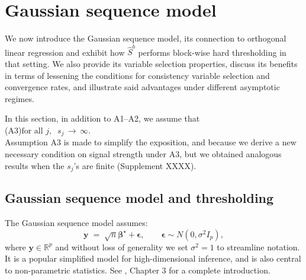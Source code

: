 \documentclass[aos]{imsart}
\theoremstyle{plain}
\newcommand{\bs}{\boldsymbol}
\begin{document}
\section{Gaussian sequence model}\label{sec:properties_orth}

We now introduce the Gaussian sequence model, its connection to orthogonal linear regression and exhibit how $\hat S^b$ performs block-wise hard thresholding in that setting. We also provide its variable selection properties, discuss its benefits in terms of lessening the conditions for consistency variable selection and convergence rates, and illustrate said advantages under different asymptotic regimes.

In this section, in addition to A1--A2, we assume that \\[5pt]
(A3)\quad $\text{for all } j, \;\; s_j \,\to \, \infty$.\\[5pt]
Assumption A3 is made to simplify the exposition, and because we derive a new necessary condition on signal strength under A3, but we obtained analogous results when the $s_j$'s are finite (Supplement XXXX).

\subsection{Gaussian sequence model and thresholding}\label{sec:GSMgen}

The Gaussian sequence model assumes:
\begin{equation}\label{eq:GSM}
	\bs y \;=\; \sqrt{n} \bs \beta^{\star} + \bs\epsilon,\qquad \bs \epsilon \sim N(0,\sigma^2 I_p),
\end{equation}
where $\bs y \in \mathbb{R}^p$ and without loss of generality we set $\sigma^2=1$ to streamline notation. It is a popular simplified model for high-dimensional inference, and is also central to non-parametric statistics. See \cite{johnstone}, Chapter 3 for a complete introduction.
\end{document}
